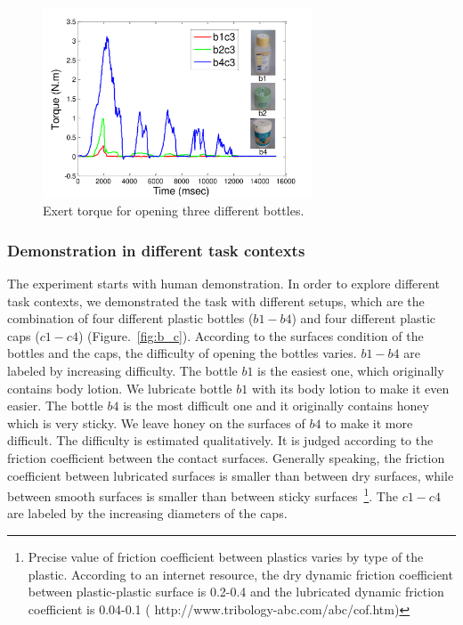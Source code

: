 \begin{figure}
  \centering
  \includegraphics[width=8cm]{./fig/b1b2b4_time_T.pdf}
  \caption{ \scriptsize{Exert torque for opening three different bottles.}
}
\label{fig:bottlepatterns}
\end{figure}


\subsubsection{Demonstration in different task contexts}
\label{sec:exp_context}
The experiment starts with human demonstration. In order to explore different task contexts, we demonstrated the task with different setups, which are the combination of four different plastic bottles ($b1-b4$) and four different plastic caps ($c1-c4$) (Figure.~\ref{fig:b_c}).
According to the surfaces condition of the bottles and the caps, the difficulty of opening the bottles varies. $b1-b4$ are labeled by increasing difficulty. The bottle $b1$ is the easiest one, which originally contains body lotion. We lubricate bottle $b1$ with its body lotion to make it even easier. The bottle $b4$ is the most difficult one and it originally contains honey which is very sticky. We leave honey on the surfaces of $b4$ to make it more difficult. The difficulty is estimated qualitatively. It is judged according to the friction coefficient between the contact surfaces. Generally speaking, the friction coefficient between lubricated surfaces is smaller than between dry surfaces, while between smooth  surfaces is smaller than between sticky surfaces~\footnote{Precise value of friction coefficient between plastics varies by type of the plastic. According to an internet resource, the dry dynamic friction coefficient between plastic-plastic surface is 0.2-0.4 and the lubricated dynamic friction coefficient is 0.04-0.1 ( http://www.tribology-abc.com/abc/cof.htm)}. The $c1-c4$ are labeled by the increasing diameters of the caps.

